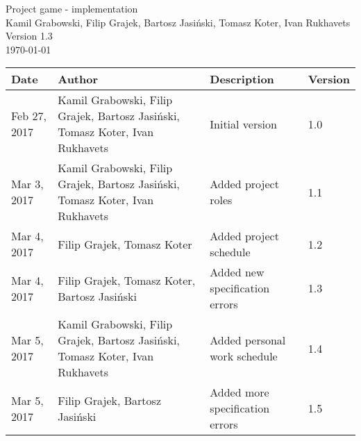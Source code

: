 \documentclass[11pt,a4paper]{article}
\begin{document}
\begin{titlepage}
\centering
\huge Project game - implementation \\
\vspace{1.5cm}
\large Kamil Grabowski, Filip Grajek, Bartosz Jasiński, Tomasz Koter, Ivan Rukhavets \\
\vspace{1.0cm}
Version 1.3 \\
\vspace{1.0cm}
\today
\end{titlepage}

\begin{longtable}{| l | p{4.5cm} | p{4.5cm} | l | }
\hline
\textbf{Date} & \textbf{Author} & \textbf{Description} & \textbf{Version} \\ \hline
Feb 27, 2017 & Kamil Grabowski, Filip Grajek, Bartosz Jasiński, Tomasz Koter, Ivan Rukhavets & Initial version & 1.0 \\ \hline
Mar 3, 2017 & Kamil Grabowski, Filip Grajek, Bartosz Jasiński, Tomasz Koter, Ivan Rukhavets & Added project roles & 1.1 \\ \hline
Mar 4, 2017 & Filip Grajek, Tomasz Koter & Added project schedule & 1.2 \\ \hline
Mar 4, 2017 & Filip Grajek, Tomasz Koter, Bartosz Jasiński & Added new specification errors & 1.3 \\ \hline
Mar 5, 2017 & Kamil Grabowski, Filip Grajek, Bartosz Jasiński, Tomasz Koter, Ivan Rukhavets  & Added personal work schedule& 1.4 \\ \hline
Mar 5, 2017 &  Filip Grajek, Bartosz Jasiński & Added more specification errors& 1.5 \\ \hline
\end{longtable}

\tableofcontents

\newpage
\end{document}
